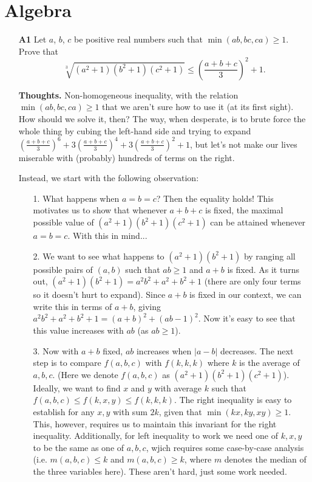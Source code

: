 \documentclass[11pt,a4paper]{article}
\begin{document}
\section{Algebra}
\begin{itemize}
\item[\textbf{A1}]
Let $a$, $b$, $c$ be positive real numbers such that $\min(ab,bc,ca) \ge 1$. Prove that $$\sqrt[3]{(a^2+1)(b^2+1)(c^2+1)} \le \left(\frac{a+b+c}{3}\right)^2 + 1.$$

\textbf{Thoughts.} 
Non-homogeneous inequality, with the relation $\min(ab,bc,ca) \ge 1$ that we aren't sure how to use it (at its first sight). 
How should we solve it, then? 
The way, when desperate, is to brute force the whole thing by cubing the left-hand side and trying to expand 
$\left(\frac{a+b+c}{3}\right)^6+3\left(\frac{a+b+c}{3}\right)^4+3\left(\frac{a+b+c}{3}\right)^2+1$, 
but let's not make our lives miserable with (probably) hundreds of terms on the right. 

Instead, we start with the following observation: 
\begin{itemize}
\item [1.] What happens when $a=b=c$? Then the equality holds! 
This motivates us to show that whenever $a+b+c$ is fixed, the maximal possible value of $(a^2+1)(b^2+1)(c^2+1)$ can be attained whenever $a=b=c$. With this in mind...
\item [2.] We want to see what happens to $(a^2+1)(b^2+1)$ by ranging all possible pairs of $(a,b)$ such that $ab\ge 1$ and $a+b$ is fixed. 
As it turns out, $(a^2+1)(b^2+1)=a^2b^2+a^2+b^2+1$ (there are only four terms so it doesn't hurt to expand). 
Since $a+b$ is fixed in our context, we can write this in terms of $a+b$, giving 
$a^2b^2+a^2+b^2+1=(a+b)^2+(ab-1)^2$. 
Now it's easy to see that this value increases with $ab$ (as $ab\ge 1$). 
\item [3.] Now with $a+b$ fixed, $ab$ increases when $|a-b|$ decreases. 
The next step is to compare $f(a,b,c)$ with $f(k,k,k)$ where $k$ is the average of $a,b,c$. 
(Here we denote $f(a,b,c)$ as $(a^2+1)(b^2+1)(c^2+1)$). 
Ideally, we want to find $x$ and $y$ with average $k$ such that 
$f(a,b,c)\le f(k,x,y)\le f(k,k,k)$. 
The right inequality is easy to establish for any $x, y$ with sum $2k$, given that $\min(kx, ky, xy)\ge 1$. 
This, however, requires us to maintain this invariant for the right inequality. 
Additionally, for left inequality to work we need one of $k, x, y$ to be the same as one of $a, b, c$, 
wjich requires some case-by-case analysis (i.e. $m(a,b,c)\le k$ and $m(a,b,c)\ge k$, where $m$ denotes the median of the three variables here). 
These aren't hard, just some work needed. 
\end{itemize}


\end{itemize}
\end{document}
